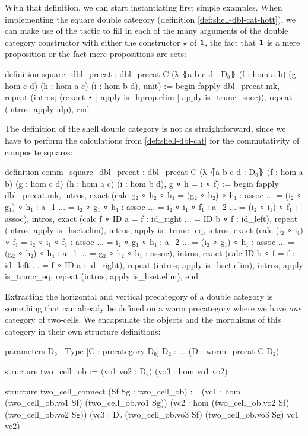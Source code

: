 With that definition, we can start instantiating first simple examples.
When implementing the square double category (definition \ref{def:shell-dbl-cat-hott}),
we can make use of the  tactic to fill in each of the many arguments
of the double category constructor with either the constructor $\star$ of $\mathbf{1}$, the
fact that $\mathbf{1}$ is a mere proposition or the fact mere propositions are sets:
\begin{leancode}
definition square_dbl_precat : dbl_precat C
  (λ ⦃a b c d : D₀⦄ (f : hom a b) (g : hom c d)
    (h : hom a c) (i : hom b d), unit) :=
begin
  fapply dbl_precat.mk,
    repeat (intros; (rexact ⋆ |  apply is_hprop.elim | apply is_trunc_succ)),
    repeat (intros;  apply idp),
end
\end{leancode}

The definition of the shell double category is not as straightforward, since we
have to perform the calculations from \ref{def:shell-dbl-cat} for the commutativity
of composite squares:
\begin{leancodebr}
definition comm_square_dbl_precat : dbl_precat C
  (λ ⦃a b c d : D₀⦄ (f : hom a b) (g : hom c d)
    (h : hom a c) (i : hom b d), g ∘ h = i ∘ f) :=
begin
  fapply dbl_precat.mk,
    intros, exact (calc g₂ ∘ h₂ ∘ h₁ = (g₂ ∘ h₂) ∘ h₁ : assoc
                                ... = (i₂ ∘ g₁) ∘ h₁ : a_1
                                ... = i₂ ∘ g₁ ∘ h₁ : assoc
                                ... = i₂ ∘ i₁ ∘ f₁ : a_2
                                ... = (i₂ ∘ i₁) ∘ f₁ : assoc),
    intros, exact (calc f ∘ ID a = f : id_right
                             ... = ID b ∘ f : id_left),
    repeat (intros; apply is_hset.elim),
    intros, apply is_trunc_eq,
    intros, exact (calc (i₂ ∘ i₁) ∘ f₁ = i₂ ∘ i₁ ∘ f₁ : assoc
                                   ... = i₂ ∘ g₁ ∘ h₁ : a_2
                                   ... = (i₂ ∘ g₁) ∘ h₁ : assoc
                                   ... = (g₂ ∘ h₂) ∘ h₁ : a_1
                                   ... = g₂ ∘ h₂ ∘ h₁ : assoc),
    intros, exact (calc ID b ∘ f = f : id_left
                             ... = f ∘ ID a : id_right),
    repeat (intros; apply is_hset.elim),
    intros, apply is_trunc_eq,
    repeat (intros; apply is_hset.elim),
end
\end{leancodebr}

Extracting the horizontal and vertical precategory of a double category is
something that can already be defined on a worm precategory where we have \emph{one}
category of two-cells.
We encapsulate the objects and the morphisms of this category in their own
structure definitions:
\begin{leancode}
parameters {D₀ : Type} [C : precategory D₀] {D₂ : ...} (D : worm_precat C D₂)

structure two_cell_ob :=
  (vo1 vo2 : D₀)
  (vo3 : hom vo1 vo2)

structure two_cell_connect (Sf Sg : two_cell_ob) :=
  (vc1 : hom (two_cell_ob.vo1 Sf) (two_cell_ob.vo1 Sg))
  (vc2 : hom (two_cell_ob.vo2 Sf) (two_cell_ob.vo2 Sg))
  (vc3 : D₂ (two_cell_ob.vo3 Sf) (two_cell_ob.vo3 Sg) vc1 vc2)
\end{leancode}

